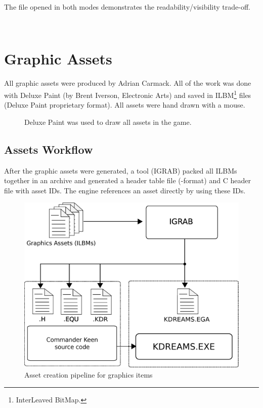 \documentclass[book.tex]{subfiles}
\begin{document}
\bigskip
 The file  opened in both modes demonstrates the readability/visibility trade-off.\\
\par

  \\
\vspace{-5pt}  
\par
\vspace{5pt}
\section{Graphic Assets}
\label{section:graphic_assets}

All graphic assets were produced by Adrian Carmack. All of the work was done with Deluxe Paint (by Brent Iverson, Electronic Arts) and saved in ILBM\footnote{InterLeaved BitMap.} files (Deluxe Paint proprietary format). All assets were hand drawn with a mouse.

\begin{figure}[H]
  \centering
 \caption{Deluxe Paint was used to draw all assets in the game.}
\end{figure}


\subsection{Assets Workflow}
After the graphic assets were generated, a tool (IGRAB) packed all ILBMs together in an archive and generated a header table file (-format) and C header file with asset IDs. The engine references an asset directly by using these IDs.\\
\begin{figure}[H]
\centering
 \includegraphics[width=.9\textwidth]{imgs/drawings/drawing_plain.eps}
 \caption{Asset creation pipeline for graphics items}
 \label{asset-creation-pipeline}
\end{figure}
\par
\begin{minipage}{\textwidth}
 \par
 \end{minipage}
 
\end{document}
